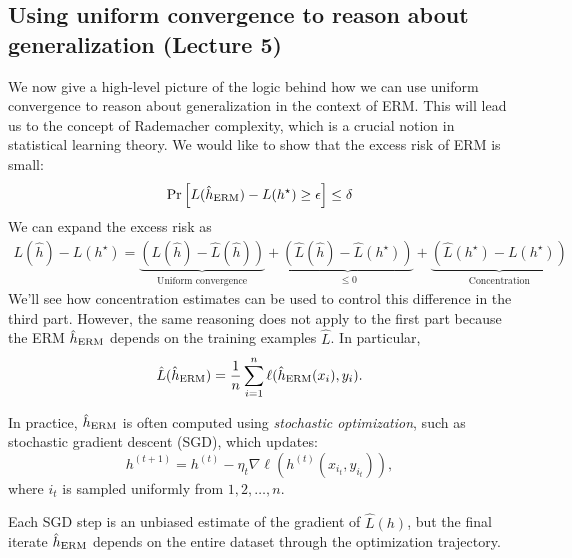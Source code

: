 
\subsection{Using uniform convergence to reason about generalization (Lecture 5)}

We now give a high-level picture of the logic behind how we can use uniform convergence to reason about generalization in the context of ERM.
This will lead us to the concept of Rademacher complexity, which is a crucial notion in statistical learning theory.
We would like to show that the excess risk of ERM is small:
\begin{align}
    \Pr\left[ L(\hat h_{\textup{ERM}}) - L(h^{\star}) \ge \epsilon \right] \le \delta
\end{align}
We can expand the excess risk as
\begin{align}
    L(\hat h) - L(h^{\star}) = \underbrace{\left(L(\hat h) - \hat L(\hat h) \right)}_{\text{Uniform convergence}} + \underbrace{\left( \hat L(\hat h) - \hat L(h^{\star}) \right)}_{\le 0} + \underbrace{\left( \hat L(h^{\star} )- L(h^{\star}) \right)}_{\text{Concentration}} 
\end{align}
We'll see how concentration estimates can be used to control this difference in the third part.
However, the same reasoning does not apply to the first part because the ERM $\hat h_{\textup{ERM}}$ depends on the training examples $\hat L$.
In particular,
\begin{align}
    \hat L(\hat h_{\textup{ERM}}) = \frac 1 n\sum_{i=1}^n \ell( \hat h_{\textup{ERM}}(x_i), y_i ).
\end{align}

\begin{example}
    In practice, $\hat h_{\textup{ERM}}$ is often computed using \emph{stochastic optimization}, such as stochastic gradient descent (SGD), which updates:
    \[ h^{(t+1)} = h^{(t)} - \eta_t \nabla \ell(h^{(t)}(x_{i_t}, y_{i_t})), \]
    where $i_t$ is sampled uniformly from $1, 2, \dots, n$.

    Each SGD step is an unbiased estimate of the gradient of $\hat L(h)$, but the final iterate $\hat h_{\textup{ERM}}$ depends on the entire dataset through the optimization trajectory.
\end{example}

